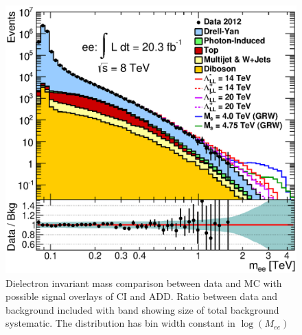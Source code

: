	\begin{figure}[h]
	    \begin{center}
	    	\includegraphics[width=0.8\linewidth]{images/invmass_main.eps}
	    \end{center}
	   \caption{Dielectron invariant mass comparison between data and MC with possible signal overlays of CI and ADD. Ratio between data and background included with band showing size of total background systematic. The distribution has bin width constant in $\log(M_{ee})$}
	   \label{fig:invMass_main}
	\end{figure}

